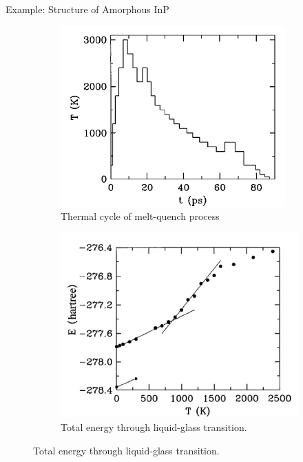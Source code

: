 \documentclass[aspectratio=169]{beamer}
\begin{document}
\begin{frame}{Example: Structure of Amorphous InP}
\begin{figure}
    \centering
    \begin{subfigure}{0.3\textwidth}
        \centering
        \includegraphics[width=\linewidth]{lectures/figures/13-InP_1.png}
    \caption{Thermal cycle of melt-quench process}
    \end{subfigure}
    \begin{subfigure}{0.3\textwidth}
        \centering
        \includegraphics[width=\linewidth]{lectures/figures/13-InP_2.png}
    \caption{Total energy through liquid-glass transition.}

\end{subfigure}
\end{figure}
\end{frame}
\end{document}

